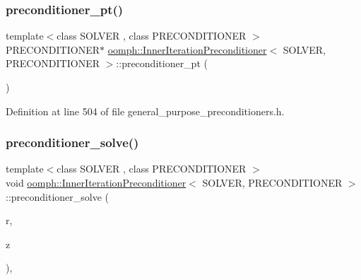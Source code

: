 \subsubsection{\texorpdfstring{preconditioner\+\_\+pt()}{preconditioner\_pt()}}
{\footnotesize\ttfamily template$<$class S\+O\+L\+V\+ER , class P\+R\+E\+C\+O\+N\+D\+I\+T\+I\+O\+N\+ER $>$ \\
P\+R\+E\+C\+O\+N\+D\+I\+T\+I\+O\+N\+ER$\ast$ \hyperlink{classoomph_1_1InnerIterationPreconditioner}{oomph\+::\+Inner\+Iteration\+Preconditioner}$<$ S\+O\+L\+V\+ER, P\+R\+E\+C\+O\+N\+D\+I\+T\+I\+O\+N\+ER $>$\+::preconditioner\+\_\+pt (\begin{DoxyParamCaption}{ }\end{DoxyParamCaption})\hspace{0.3cm}{\ttfamily [inline]}}



Definition at line 504 of file general\+\_\+purpose\+\_\+preconditioners.\+h.

\mbox{\label{classoomph_1_1InnerIterationPreconditioner_a6d30ced26206cb866f9ae51cc4caebae}} 
\subsubsection{\texorpdfstring{preconditioner\+\_\+solve()}{preconditioner\_solve()}}
{\footnotesize\ttfamily template$<$class S\+O\+L\+V\+ER , class P\+R\+E\+C\+O\+N\+D\+I\+T\+I\+O\+N\+ER $>$ \\
void \hyperlink{classoomph_1_1InnerIterationPreconditioner}{oomph\+::\+Inner\+Iteration\+Preconditioner}$<$ S\+O\+L\+V\+ER, P\+R\+E\+C\+O\+N\+D\+I\+T\+I\+O\+N\+ER $>$\+::preconditioner\+\_\+solve (\begin{DoxyParamCaption}\item[{const \hyperlink{classoomph_1_1DoubleVector}{Double\+Vector} \&}]{r,  }\item[{\hyperlink{classoomph_1_1DoubleVector}{Double\+Vector} \&}]{z }\end{DoxyParamCaption})\hspace{0.3cm}{\ttfamily [inline]}, {\ttfamily [virtual]}}



